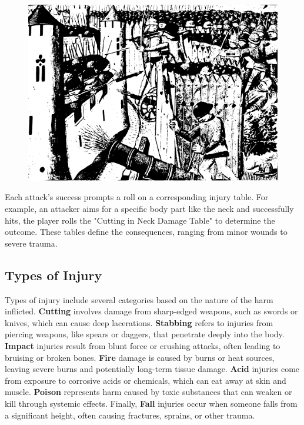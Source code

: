 \documentclass[12pt]{book}
\begin{document}
\begin{figure}[h]
    \centering
    \includegraphics[width=\textwidth]{./images/combat02.pdf}
\end{figure}

Each attack's success prompts a roll on a corresponding injury table. For example, an attacker aims for a specific body part like the neck and successfully hits, the player rolls the "Cutting in Neck Damage Table" to determine the outcome. These tables define the consequences, ranging from minor wounds to severe trauma.

\subsection{Types of Injury}

Types of injury include several categories based on the nature of the harm inflicted. \textbf{Cutting} involves damage from sharp-edged weapons, such as swords or knives, which can cause deep lacerations. \textbf{Stabbing} refers to injuries from piercing weapons, like spears or daggers, that penetrate deeply into the body. \textbf{Impact} injuries result from blunt force or crushing attacks, often leading to bruising or broken bones. \textbf{Fire} damage is caused by burns or heat sources, leaving severe burns and potentially long-term tissue damage. \textbf{Acid} injuries come from exposure to corrosive acids or chemicals, which can eat away at skin and muscle. \textbf{Poison} represents harm caused by toxic substances that can weaken or kill through systemic effects. Finally, \textbf{Fall} injuries occur when someone falls from a significant height, often causing fractures, sprains, or other trauma.
\end{document}
